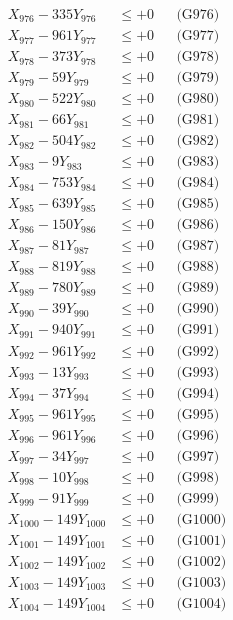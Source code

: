 \documentclass[a4paper,10pt]{article}
\begin{document}
{\begin{align}
X_{976} - 335Y_{976} &\leq +0 && \text{(G976)} \\
X_{977} - 961Y_{977} &\leq +0 && \text{(G977)} \\
X_{978} - 373Y_{978} &\leq +0 && \text{(G978)} \\
X_{979} - 59Y_{979} &\leq +0 && \text{(G979)} \\
X_{980} - 522Y_{980} &\leq +0 && \text{(G980)} \\
\allowbreak
X_{981} - 66Y_{981} &\leq +0 && \text{(G981)} \\
X_{982} - 504Y_{982} &\leq +0 && \text{(G982)} \\
X_{983} - 9Y_{983} &\leq +0 && \text{(G983)} \\
X_{984} - 753Y_{984} &\leq +0 && \text{(G984)} \\
X_{985} - 639Y_{985} &\leq +0 && \text{(G985)} \\
X_{986} - 150Y_{986} &\leq +0 && \text{(G986)} \\
X_{987} - 81Y_{987} &\leq +0 && \text{(G987)} \\
X_{988} - 819Y_{988} &\leq +0 && \text{(G988)} \\
X_{989} - 780Y_{989} &\leq +0 && \text{(G989)} \\
X_{990} - 39Y_{990} &\leq +0 && \text{(G990)} \\
\allowbreak
X_{991} - 940Y_{991} &\leq +0 && \text{(G991)} \\
X_{992} - 961Y_{992} &\leq +0 && \text{(G992)} \\
X_{993} - 13Y_{993} &\leq +0 && \text{(G993)} \\
X_{994} - 37Y_{994} &\leq +0 && \text{(G994)} \\
X_{995} - 961Y_{995} &\leq +0 && \text{(G995)} \\
X_{996} - 961Y_{996} &\leq +0 && \text{(G996)} \\
X_{997} - 34Y_{997} &\leq +0 && \text{(G997)} \\
X_{998} - 10Y_{998} &\leq +0 && \text{(G998)} \\
X_{999} - 91Y_{999} &\leq +0 && \text{(G999)} \\
X_{1000} - 149Y_{1000} &\leq +0 && \text{(G1000)} \\
\allowbreak
X_{1001} - 149Y_{1001} &\leq +0 && \text{(G1001)} \\
X_{1002} - 149Y_{1002} &\leq +0 && \text{(G1002)} \\
X_{1003} - 149Y_{1003} &\leq +0 && \text{(G1003)} \\
X_{1004} - 149Y_{1004} &\leq +0 && \text{(G1004)} \\

\end{align}}
\end{document}
